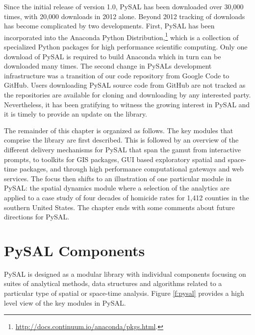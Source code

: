 \documentclass[11pt, titlepage]{amsart}
\begin{document}
Since the initial release of version 1.0, PySAL has been downloaded over 30,000
times, with 20,000 downloads in 2012 alone. Beyond 2012 tracking of
downloads has become complicated by two developments. First, PySAL has
been incorporated into the Anaconda Python
Distribution,\footnote{\url{http://docs.continuum.io/anaconda/pkgs.html}.} which is a
collection of specialized Python packages for high performance
scientific computing. Only one download of PySAL is required to build
Anaconda which in turn can be downloaded many times. The second change
in PySALs development infrastructure was a transition of our code
repository from Google Code to GitHub. Users downloading PySAL source
code from GitHub are not tracked as the repositories are available for
cloning and downloading by any interested party. Nevertheless, it has
been gratifying to witness the growing interest in PySAL and it is
timely to provide an update on the library.

The remainder of this chapter is organized as follows. The key modules
that comprise the library are first described. This is followed by an overview
of the different delivery mechanisms for PySAL that span the gamut from
interactive prompts, to toolkits for GIS packages, GUI based exploratory
spatial and space-time packages, and through high performance
computational gateways and web services. The focus then shifts to an
illustration of one particular module in PySAL: the spatial dynamics
module where a selection of the analytics are applied to a case study of
four decades of homicide rates for 1,412 counties in the southern United
States. The chapter ends with some comments about future directions for PySAL.

\section{PySAL Components}

PySAL is designed as a modular library with individual components
focusing on suites of analytical methods, data structures and algorithms
related to a particular type of spatial or space-time analysis. Figure
\ref{f:pysal} provides a high level view of the key modules in PySAL.
\end{document}
